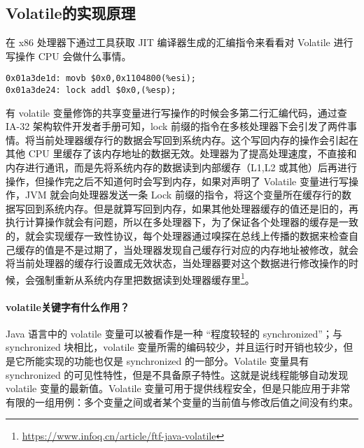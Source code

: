 \documentclass[../../../interview-questions.tex]{subfiles}
\begin{document}
\subsection{Volatile的实现原理}

在 x86 处理器下通过工具获取 JIT 编译器生成的汇编指令来看看对 Volatile 进行写操作 CPU 会做什么事情。

\begin{lstlisting}
0x01a3de1d: movb $0x0,0x1104800(%esi);
0x01a3de24: lock addl $0x0,(%esp);
\end{lstlisting}

有 volatile 变量修饰的共享变量进行写操作的时候会多第二行汇编代码，通过查 IA-32 架构软件开发者手册可知，lock 前缀的指令在多核处理器下会引发了两件事情。将当前处理器缓存行的数据会写回到系统内存。这个写回内存的操作会引起在其他 CPU 里缓存了该内存地址的数据无效。处理器为了提高处理速度，不直接和内存进行通讯，而是先将系统内存的数据读到内部缓存（L1,L2 或其他）后再进行操作，但操作完之后不知道何时会写到内存，如果对声明了 Volatile 变量进行写操作，JVM 就会向处理器发送一条 Lock 前缀的指令，将这个变量所在缓存行的数据写回到系统内存。但是就算写回到内存，如果其他处理器缓存的值还是旧的，再执行计算操作就会有问题，所以在多处理器下，为了保证各个处理器的缓存是一致的，就会实现缓存一致性协议，每个处理器通过嗅探在总线上传播的数据来检查自己缓存的值是不是过期了，当处理器发现自己缓存行对应的内存地址被修改，就会将当前处理器的缓存行设置成无效状态，当处理器要对这个数据进行修改操作的时候，会强制重新从系统内存里把数据读到处理器缓存里\footnote{\url{https://www.infoq.cn/article/ftf-java-volatile}}。

\paragraph{volatile关键字有什么作用？}

Java 语言中的 volatile 变量可以被看作是一种 “程度较轻的 synchronized”；与 synchronized 块相比，volatile 变量所需的编码较少，并且运行时开销也较少，但是它所能实现的功能也仅是 synchronized 的一部分。Volatile 变量具有 synchronized 的可见性特性，但是不具备原子特性。这就是说线程能够自动发现 volatile 变量的最新值。Volatile 变量可用于提供线程安全，但是只能应用于非常有限的一组用例：多个变量之间或者某个变量的当前值与修改后值之间没有约束。
\end{document}
